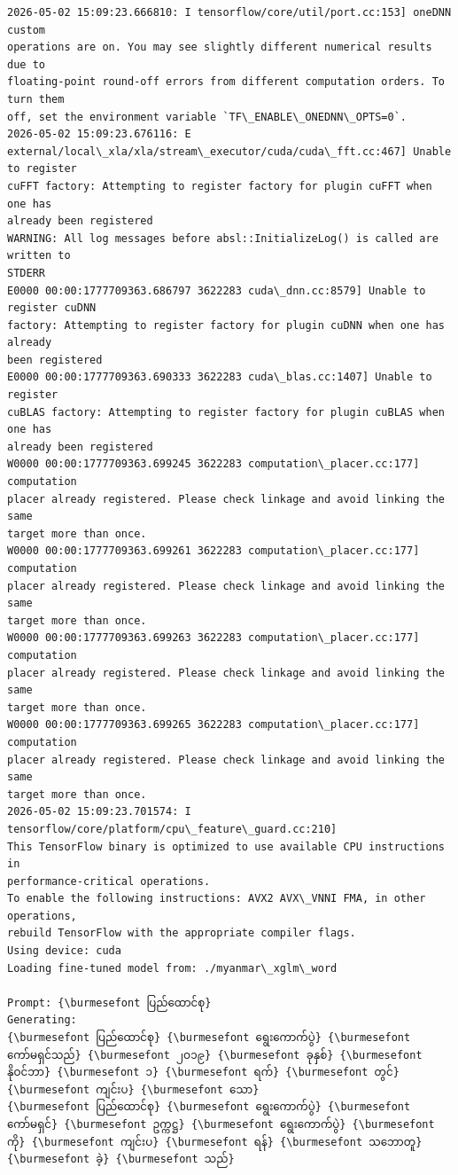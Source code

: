 \documentclass[11pt]{article}
\begin{document}
    \begin{Verbatim}[commandchars=\\\{\}]
2026-05-02 15:09:23.666810: I tensorflow/core/util/port.cc:153] oneDNN custom
operations are on. You may see slightly different numerical results due to
floating-point round-off errors from different computation orders. To turn them
off, set the environment variable `TF\_ENABLE\_ONEDNN\_OPTS=0`.
2026-05-02 15:09:23.676116: E
external/local\_xla/xla/stream\_executor/cuda/cuda\_fft.cc:467] Unable to register
cuFFT factory: Attempting to register factory for plugin cuFFT when one has
already been registered
WARNING: All log messages before absl::InitializeLog() is called are written to
STDERR
E0000 00:00:1777709363.686797 3622283 cuda\_dnn.cc:8579] Unable to register cuDNN
factory: Attempting to register factory for plugin cuDNN when one has already
been registered
E0000 00:00:1777709363.690333 3622283 cuda\_blas.cc:1407] Unable to register
cuBLAS factory: Attempting to register factory for plugin cuBLAS when one has
already been registered
W0000 00:00:1777709363.699245 3622283 computation\_placer.cc:177] computation
placer already registered. Please check linkage and avoid linking the same
target more than once.
W0000 00:00:1777709363.699261 3622283 computation\_placer.cc:177] computation
placer already registered. Please check linkage and avoid linking the same
target more than once.
W0000 00:00:1777709363.699263 3622283 computation\_placer.cc:177] computation
placer already registered. Please check linkage and avoid linking the same
target more than once.
W0000 00:00:1777709363.699265 3622283 computation\_placer.cc:177] computation
placer already registered. Please check linkage and avoid linking the same
target more than once.
2026-05-02 15:09:23.701574: I tensorflow/core/platform/cpu\_feature\_guard.cc:210]
This TensorFlow binary is optimized to use available CPU instructions in
performance-critical operations.
To enable the following instructions: AVX2 AVX\_VNNI FMA, in other operations,
rebuild TensorFlow with the appropriate compiler flags.
Using device: cuda
Loading fine-tuned model from: ./myanmar\_xglm\_word

Prompt: {\burmesefont ပြည်ထောင်စု}
Generating:
{\burmesefont ပြည်ထောင်စု} {\burmesefont ရွေးကောက်ပွဲ} {\burmesefont ကော်မရှင်သည်} {\burmesefont ၂ဝ၁၉} {\burmesefont ခုနှစ်} {\burmesefont နိုဝင်ဘာ} {\burmesefont ၁} {\burmesefont ရက်} {\burmesefont တွင်} {\burmesefont ကျင်းပ} {\burmesefont သော}
{\burmesefont ပြည်ထောင်စု} {\burmesefont ရွေးကောက်ပွဲ} {\burmesefont ကော်မရှင်} {\burmesefont ဥက္ကဋ္ဌ} {\burmesefont ရွေးကောက်ပွဲ} {\burmesefont ကို} {\burmesefont ကျင်းပ} {\burmesefont ရန်} {\burmesefont သဘောတူ}
{\burmesefont ခဲ့} {\burmesefont သည်}
    \end{Verbatim}
\end{document}
